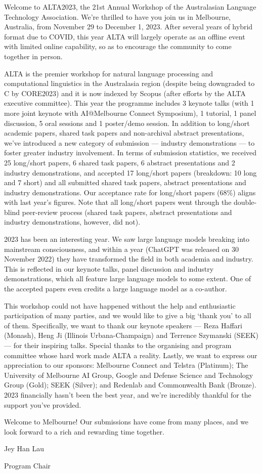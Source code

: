 Welcome to ALTA2023, the 21st Annual Workshop of the Australasian Language Technology Association. We're thrilled to have you join us in Melbourne, Australia, from November 29 to December 1, 2023. After several years of hybrid format due to COVID, this year ALTA will largely operate as an offline event with limited online capability, so as to encourage the community to come together in person.\newline

ALTA is the premier workshop for natural language processing and computational linguistics in the Australasia region (despite being downgraded to C by CORE2023) and it is now indexed by Scopus (after efforts by the ALTA executive committee). This year the programme includes 3 keynote talks (with 1 more joint keynote with AI@Melbourne Connect Symposium), 1 tutorial, 1 panel discussion, 5 oral sessions and 1 poster/demo session. In addition to long/short academic papers, shared task papers and non-archival abstract presentations, we've introduced a new category of submission --- industry demonstrations --- to foster greater industry involvement. In terms of submission statistics, we received 25 long/short papers, 6 shared task papers, 6 abstract presentations and 2 industry demonstrations, and accepted 17 long/short papers (breakdown: 10 long and 7 short) and all submitted shared task papers, abstract presentations and industry demonstrations. Our acceptance rate for long/short papers (68\%) aligns with last year's figures. Note that all long/short papers went through the double-blind peer-review process (shared task papers, abstract presentations and industry demonstrations, however, did not). \newline

2023 has been an interesting year. We saw large language models breaking into mainstream consciousness, and within a year (ChatGPT was released on 30 November 2022) they have transformed the field in both academia and industry. This is reflected in our keynote talks, panel discussion and industry demonstrations, which all feature large language models to some extent. One of the accepted papers even credits a large language model as a co-author.\newline

This workshop could not have happened without the help and enthusiastic participation of many parties, and we would like to give a big `thank you' to all of them. Specifically, we want to thank our keynote speakers --- Reza Haffari (Monash), Heng Ji (Illinois Urbana-Champaign) and Terrence Szymanski (SEEK) --- for their inspiring talks. Special thanks to the organising and program committee whose hard work made ALTA a reality. Lastly, we want to express our appreciation to our sponsors: Melbourne Connect and Telstra (Platinum); The University of Melbourne AI Group, Google and Defense Science and Technology Group (Gold); SEEK (Silver); and Redenlab and Commonwealth Bank (Bronze). 2023 financially hasn't been the best year, and we're incredibly thankful for the support you've provided.\newline

Welcome to Melbourne! Our submissions have come from many places, and we look forward to a rich and rewarding time together.\newline\newline\newline

Jey Han Lau\newline

Program Chair
